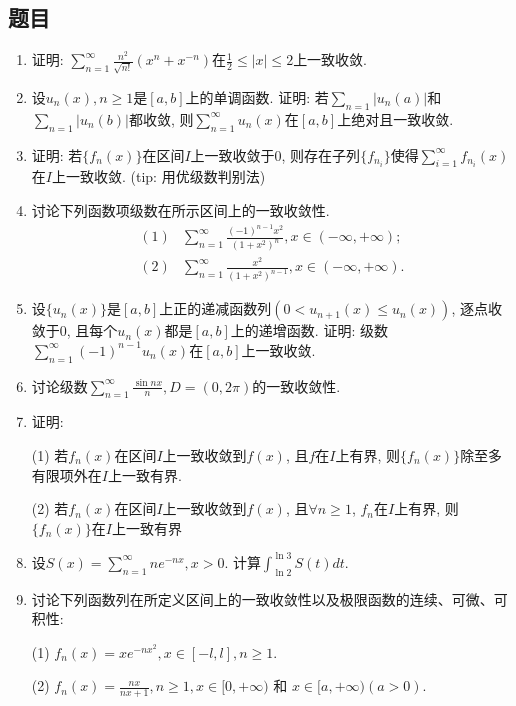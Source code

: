 \documentclass[UTF8,11pt, a4paper, oneside, fontset=none]{ctexbook}
\begin{document}
\subsection*{题目}
\begin{enumerate}

\item 证明: $\sum_{n=1}^{\infty} \frac{n^2}{\sqrt{n!}} (x^n + x^{-n})$在$\frac{1}{2} \leq |x| \leq 2$上一致收敛.

\item 设$u_n(x), n \geq 1$是$[a, b]$上的单调函数. 证明: 若$\sum_{n=1} |u_n(a)|$和$\sum_{n=1} |u_n(b)|$都收敛, 则$\sum_{n=1}^{\infty} u_n(x)$在$[a, b]$上绝对且一致收敛.

\item 证明: 若$\{f_n(x) \}$在区间$I$上一致收敛于0, 则存在子列$\{f_{n_i} \}$使得$\sum_{i=1}^{\infty} f_{n_i}(x)$在$I$上一致收敛. (tip: 用优级数判别法)

\item 讨论下列函数项级数在所示区间上的一致收敛性.
\begin{align*}
(1) & \sum_{n=1}^{\infty} \frac{(-1)^{n-1}x^2}{(1 + x^2)^n}, x \in (-\infty, +\infty);\\
(2) &  \sum_{n=1}^{\infty} \frac{x^2}{(1 + x^2)^{n-1}}, x \in (-\infty, +\infty).
\end{align*}

\item 设$\{ u_n(x) \}$是$[a, b]$上正的递减函数列$(0 < u_{n+1}(x) \leq u_n(x))$, 逐点收敛于0, 且每个$u_n(x)$都是$[a, b]$上的递增函数. 证明: 级数$\sum_{n=1}^{\infty} (-1)^{n-1} u_n(x)$在$[a, b]$上一致收敛.

\item 讨论级数$\sum_{n=1}^{\infty} \frac{\sin n x}{n}, D = (0, 2\pi)$的一致收敛性.

\item 证明:

(1) 若$f_n(x)$在区间$I$上一致收敛到$f(x)$, 且$f$在$I$上有界, 则$\{f_n(x) \}$除至多有限项外在$I$上一致有界.

(2) 若$f_n(x)$在区间$I$上一致收敛到$f(x)$, 且$\forall n \geq 1$, $f_n$在$I$上有界, 则$\{f_n(x) \}$在$I$上一致有界

\item 设$S(x) = \sum_{n=1}^{\infty} n e^{-n x}, x > 0$. 计算$\int_{\ln 2}^{\ln 3} S(t) dt$.

\item 讨论下列函数列在所定义区间上的一致收敛性以及极限函数的连续、可微、可积性:

(1) $f_n(x) = x e^{-nx^2}, x \in [-l, l], n \geq 1$.

(2) $f_n(x) = \frac{nx}{nx+1}, n \geq 1, x \in [0, +\infty) \mbox{\ 和\ } x \in [a, +\infty) (a > 0) $.

\end{enumerate}
\clearpage
\end{document}
